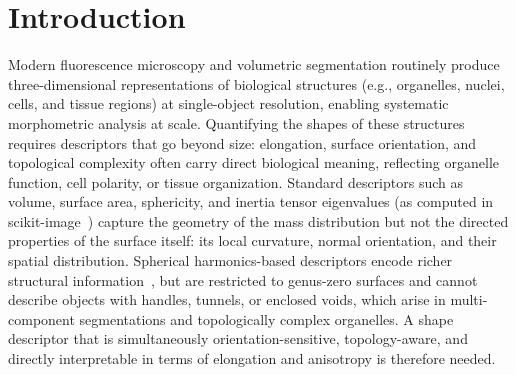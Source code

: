 \documentclass[unnumsec,webpdf,contemporary,large,namedate]{oup-authoring-template}
\begin{document}

\maketitle

\section{Introduction}

Modern fluorescence microscopy and volumetric segmentation routinely produce three-dimensional representations of biological structures (e.g., organelles, nuclei, cells, and tissue regions) at single-object resolution, enabling systematic morphometric analysis at scale.
Quantifying the shapes of these structures requires descriptors that go beyond size: elongation, surface orientation, and topological complexity often carry direct biological meaning, reflecting organelle function, cell polarity, or tissue organization.
Standard descriptors such as volume, surface area, sphericity, and inertia tensor eigenvalues (as computed in scikit-image~\citep{vanderwalt2014scikit}) capture the geometry of the mass distribution but not the directed properties of the surface itself: its local curvature, normal orientation, and their spatial distribution.
Spherical harmonics-based descriptors encode richer structural information~\citep{Kazhdan2003, viana2023integrated}, but are restricted to genus-zero surfaces and cannot describe objects with handles, tunnels, or enclosed voids, which arise in multi-component segmentations and topologically complex organelles.
A shape descriptor that is simultaneously orientation-sensitive, topology-aware, and directly interpretable in terms of elongation and anisotropy is therefore needed.
\end{document}
